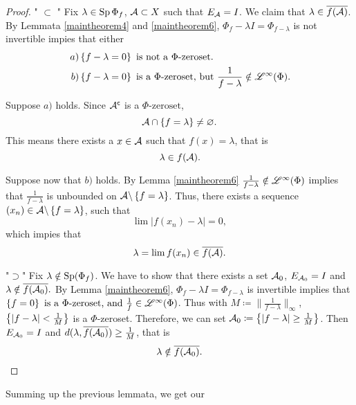 \begin{proof}
 " $\subset$ "
 Fix $\lambda \in \operatorname{Sp} \Phi_f$, $\mathcal{A} \subset X$ such that $E_\mathcal{A} = I$.
 We claim that $\lambda \in \overline{f(\mathcal{A})}$. By Lemmata \ref{maintheorem4}
 and \ref{maintheorem6}, $\Phi_f - \lambda I= \Phi_{f - \lambda}$ is 
 not invertible impies that either
\begin{align*}
  \left.  a\right)& \left\lbrace f- \lambda = 0 \right\rbrace \text{ is not a }\Phi
  \text{-zeroset}.\\
  \left.  b\right)& \left\lbrace f - \lambda =0 \right\rbrace \text{ is a }\Phi\text{-zeroset,
    but } \frac{1}{f- \lambda} \notin \mathscr{L}^\infty (\Phi).
\end{align*}

Suppose $a)$ holds. Since $\mathcal{A}^\mathsf{c}$ is a $\Phi\text{-zeroset}$,
\[
\mathcal{A} \cap \left\lbrace f= \lambda \right\rbrace \neq \varnothing .
\]
This means there exists a $x \in \mathcal{A}$ such that $f(x) = \lambda$, that is
\[
\lambda \in f(\mathcal{A}).
\]

Suppose now that $b)$ holds. By Lemma \ref{maintheorem6} $\frac{1}{f- \lambda}
\notin \mathscr{L}^\infty (\Phi)$ implies that $\frac{1}{f- \lambda}$ is unbounded on
$\mathcal{A} \backslash \left\lbrace f= \lambda \right\rbrace$. Thus, there exists a sequence
$(x_n) \in \mathcal{A} \backslash \left\lbrace f= \lambda \right\rbrace$, such that
\[
 \lim | f(x_n) - \lambda| =0,
\]
which impies that
\[
\lambda = \lim f(x_n) \in \overline{f(\mathcal{A})}.
\]

"$\supset$"
Fix $\lambda \notin \operatorname{Sp} (\Phi_f)$. We have to show that there exists a set
$\mathcal{A}_0$, $E_{\mathcal{A}_0} = I$ and $\lambda \notin \overline{f(\mathcal{A}_0)}.$
By Lemma \ref{maintheorem6}, $\Phi_f - \lambda I= \Phi_{f- \lambda}$ is 
invertible implies that $ \left\lbrace f = 0 \right\rbrace  \text{ is a }   \Phi
\text{-zeroset,} \text{ and } \frac{1}{f}  \in \mathscr{L}^\infty (\Phi)$. Thus with 
$M \coloneqq \| \frac{1}{f - \lambda} \|_\infty$,
$\left\lbrace | f- \lambda | < \frac{1}{M} \right\rbrace$ is a $\Phi$-zeroset. Therefore,
we can set $\mathcal{A}_0 \coloneqq \left\lbrace | f- \lambda | \geq \frac{1}{M} \right\rbrace $.
Then $E_{\mathcal{A}_0} = I$ and $d(\lambda, \overline{f(\mathcal{A}_0)}) \geq
\frac{1}{M}$, that is 
\[
\lambda \notin \overline{f(\mathcal{A}_0)}.
\]

  
\end{proof}


Summing up the previous lemmata, we get our


